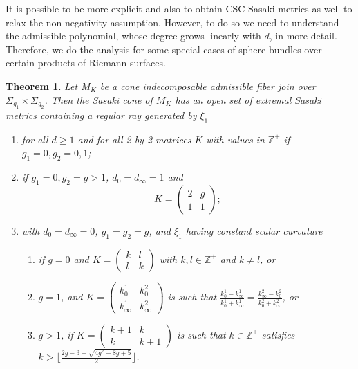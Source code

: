 \documentclass[12pt]{amsart}
\newtheorem{theorem}{Theorem}[section]
\def\bbz{{\mathbb Z}}
\def\grS{\Sigma}
\begin{document}
It is possible to be more explicit and also to obtain CSC Sasaki metrics as well to relax the non-negativity assumption. However, to do so we need to understand the admissible polynomial, whose degree grows linearly with $d$, in more detail. 
Therefore, we do the analysis for some special cases of sphere bundles over certain products of Riemann surfaces.

\begin{theorem}\label{noncothm}
Let $M_K$ be a cone indecomposable admissible fiber join over $\grS_{g_1}\times \grS_{g_2}$. 
Then the Sasaki cone of $M_K$ has an open set of extremal Sasaki metrics containing a regular ray generated by $\xi_1$ 
\begin{enumerate}
\item for all $d\geq 1$ and for all 2 by 2 matrices $K$ with values in $\bbz^+$ if $g_1=0, g_2=0,1$;
\item if $g_1=0, g_2=g>1$, $d_0=d_\infty=1$ and  
\begin{equation*}\label{specextrmatrix}
K= \begin{pmatrix}
     2 & g \\
     1 & 1
\end{pmatrix};
\end{equation*}
\item with $d_0=d_\infty=0$, $g_1=g_2=g$, and $\xi_1$ having constant scalar curvature
\begin{enumerate}
\item if $g=0$ and $K= \begin{pmatrix}
    k & l \\
l & k
\end{pmatrix}$
with $k,l\in \bbz^+$ and $k\neq l$, or
\item $g=1$,
and $K= \begin{pmatrix}
     k^1_0 & k^2_0 \\
k^1_{\infty} & k^2_{\infty}
\end{pmatrix}$ is such that 
$\frac{k^1_0-k^1_\infty}{k^1_0+k^1_\infty}=\frac{k^2_\infty-k^2_0}{k^2_0+k^2_\infty}$, or
\item $g>1$,
if $K= \begin{pmatrix}
     k+1 & k \\
k & k+1
\end{pmatrix}$ is such that $k\in \bbz^+$ satisfies
$k> \lfloor\frac{2 g-3 +\sqrt{4 g^2-8 g+5}}{2} \rfloor$. 
\end{enumerate}
\end{enumerate}
\end{theorem}
\end{document}
